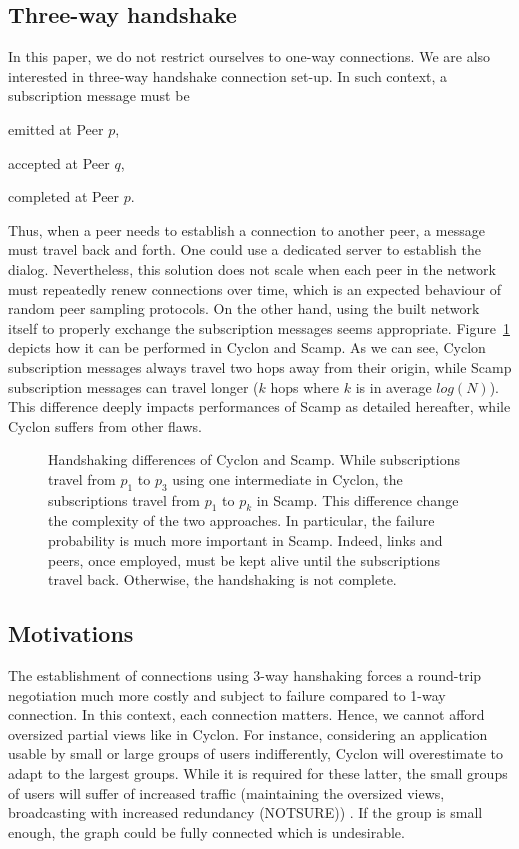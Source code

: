 \subsection{Three-way handshake}
In this paper, we do not restrict ourselves to one-way connections. We are 
also interested in three-way handshake connection set-up. In such context, 
a subscription message must be
\begin{inparaenum}[(1)]
\item emitted at Peer $p$,
\item accepted at Peer $q$,
\item completed at Peer $p$.
\end{inparaenum}
Thus, when a peer needs to establish a connection to another peer, a message
must travel back and forth. One could use a dedicated server to establish the
dialog. Nevertheless, this solution does not scale when each peer in the
network must repeatedly renew connections over time, which is an expected
behaviour of random peer sampling protocols. On the other hand, using the built
network itself to properly exchange the subscription messages seems
appropriate. Figure~\ref{fig:handshakeexample} depicts how it can be performed
in Cyclon and Scamp. As we can see, Cyclon subscription messages always travel
two hops away from their origin, while Scamp subscription messages can travel
longer ($k$ hops where $k$ is in average $log(N)$).  This difference deeply
impacts performances of Scamp as detailed hereafter, while Cyclon suffers from
other flaws.

\begin{figure}
  \centering
  
  \caption{\label{fig:handshakeexample}Handshaking differences of Cyclon and
    Scamp. While subscriptions travel from $p_1$ to $p_3$ using one
    intermediate in Cyclon, the subscriptions travel from $p_1$ to $p_k$ in
    Scamp. This difference change the complexity of the two approaches. In
    particular, the failure probability is much more important in
    Scamp. Indeed, links and peers, once employed, must be kept alive until the
    subscriptions travel back. Otherwise, the handshaking is not complete.}
\end{figure}


\subsection{Motivations}
The establishment of connections using 3-way hanshaking forces a round-trip
negotiation much more costly and subject to failure compared to 1-way
connection. In this context, each connection matters. Hence, we cannot afford
oversized partial views like in Cyclon. For instance, considering an
application usable by small or large groups of users indifferently, Cyclon will
overestimate to adapt to the largest groups. While it is required for these
latter, the small groups of users will suffer of increased traffic (maintaining
the oversized views, broadcasting with increased redundancy (NOTSURE)) . If the
group is small enough, the graph could be fully connected which is undesirable.

